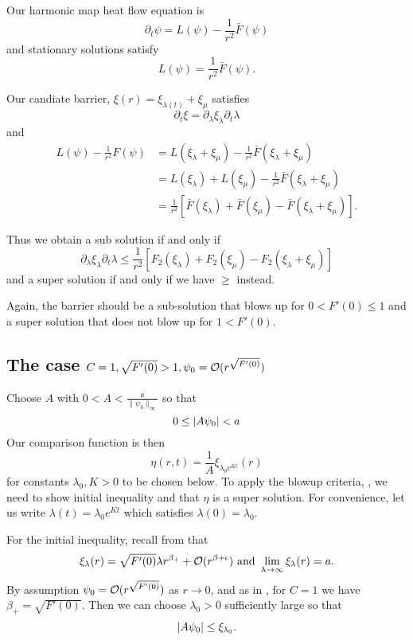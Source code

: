 \documentclass{amsart}
\begin{document}
Our harmonic map heat flow equation is
\[
\partial_t \psi = L(\psi) - \frac{1}{r^2} \bar{F}(\psi)
\]
and stationary solutions satisfy
\[
L(\psi) = \frac{1}{r^2} \bar{F}(\psi).
\]

Our candiate barrier, \(\xi(r) = \xi_{\lambda(t)} + \xi_{\mu}\) satisfies
\[
\partial_t \xi = \partial_{\lambda} \xi_{\lambda} \partial_t \lambda
\]
and
\[
\begin{split}
L(\psi) - \frac{1}{r^2} F(\psi) &= L(\xi_{\lambda} + \xi_{\mu}) - \frac{1}{r^2} \bar{F}(\xi_{\lambda} + \xi_{\mu}) \\
&= L(\xi_{\lambda}) + L(\xi_{\mu}) - \frac{1}{r^2} \bar{F}(\xi_{\lambda} + \xi_{\mu}) \\
&= \frac{1}{r^2}\left[\bar{F}(\xi_{\lambda}) + \bar{F}(\xi_{\mu}) - \bar{F}(\xi_{\lambda} + \xi_{\mu})\right].
\end{split}
\]

Thus we obtain a sub solution if and only if
\[
\partial_{\lambda} \xi_{\lambda} \partial_t \lambda \leq \frac{1}{r^2}\left[F_2(\xi_{\lambda}) + F_2(\xi_{\mu}) - F_2(\xi_{\lambda} + \xi_{\mu})\right]
\]
and a super solution if and only if we have \(\geq\) instead.

{\color{red}Again, the barrier should be a sub-solution that blows up for \(0 < F'(0) \leq 1\)  and a super solution that does not blow up for \(1 < F'(0)\).}


\subsection{The case \(C=1, \sqrt{F'(0)} > 1, \psi_0 = \operatorname{\mathcal{O}}(r^{\sqrt{F'(0)}})\)}

Choose \(A\) with \(0 < A < \frac{a}{\|\psi_0\|_{\infty}}\) so that
\begin{equation}
\label{eq:scaled_Linfty}
0 \leq \left|{A \psi_0}\right| < a
\end{equation}
Our comparison function is then
\begin{equation}
\label{eq:comparisonC1}
\eta(r, t) = \frac{1}{A} \xi_{\lambda_0 e^{Kt}} (r)
\end{equation}
for constants \(\lambda_0, K > 0\) to be chosen below. To apply the blowup criteria, , we need to show initial inequality and that \(\eta\) is a super solution. For convenience, let us write \(\lambda(t) = \lambda_0 e^{Kt}\) which satisfies \(\lambda(0) = \lambda_0\).

For the initial inequality, recall from  that
\[
\xi_{\lambda} (r) = \sqrt{F'(0)} \lambda r^{\beta_+} + \operatorname{\mathcal{O}}(r^{\beta + \epsilon}) \text{ and } \lim_{\lambda \to \infty} \xi_{\lambda} (r) = a.
\]
By assumption \(\psi_0 = \operatorname{\mathcal{O}}(r^{\sqrt{F'(0)}})\) as \(r \to 0\), and as in , for \(C=1\) we have \(\beta_+ = \sqrt{F'(0)}\). Then we can choose \(\lambda_0 > 0\) sufficiently large so that
\[
\left|{A \psi_0}\right| \leq \xi_{\lambda_0}.
\]
\end{document}
